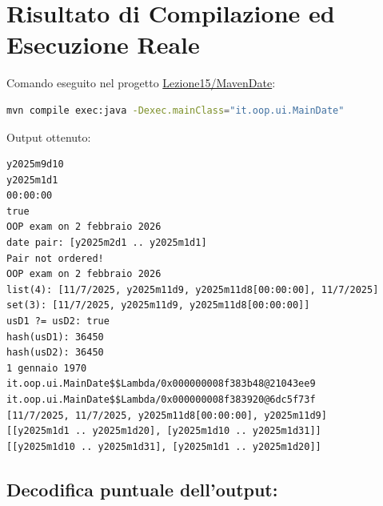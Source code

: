 \documentclass[11pt,a4paper,oneside]{report}
\begin{document}
\section{Risultato di Compilazione ed Esecuzione
Reale}\label{chap14_risultato-di-compilazione-ed-esecuzione-reale}

Comando eseguito nel progetto
\href{file:///home/wally/Documenti/GitHub/Programmazione-II/25-26/Teoria-e-Esercitazioni/Codice-20260902/Lezione15/MavenDate}{Lezione15/MavenDate}:

\begin{lstlisting}[language=bash]
mvn compile exec:java -Dexec.mainClass="it.oop.ui.MainDate"
\end{lstlisting}

Output ottenuto:

\begin{lstlisting}
y2025m9d10
y2025m1d1
00:00:00
true
OOP exam on 2 febbraio 2026
date pair: [y2025m2d1 .. y2025m1d1]
Pair not ordered!
OOP exam on 2 febbraio 2026
list(4): [11/7/2025, y2025m11d9, y2025m11d8[00:00:00], 11/7/2025]
set(3): [11/7/2025, y2025m11d9, y2025m11d8[00:00:00]]
usD1 ?= usD2: true
hash(usD1): 36450
hash(usD2): 36450
1 gennaio 1970
it.oop.ui.MainDate$$Lambda/0x000000008f383b48@21043ee9
it.oop.ui.MainDate$$Lambda/0x000000008f383920@6dc5f73f
[11/7/2025, 11/7/2025, y2025m11d8[00:00:00], y2025m11d9]
[[y2025m1d1 .. y2025m1d20], [y2025m1d10 .. y2025m1d31]]
[[y2025m1d10 .. y2025m1d31], [y2025m1d1 .. y2025m1d20]]
\end{lstlisting}

\subsection{Decodifica puntuale
dell'output:}\label{chap14_decodifica-puntuale-delloutput}
\end{document}
